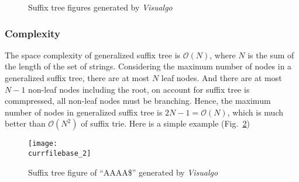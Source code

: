 \documentclass[catalog.tex]{subfiles}
\begin{document}
\begin{figure}[!htb]
	\centering
	\hspace{2cm} %
	\caption{Suffix tree figures generated by {\it Visualgo}\cite{visualgo.net}}
	\label{fig:\currfilebase_group1}
\end{figure}

	\subsubsection*{Complexity}
		The space complexity of generalized suffix tree is $\mathcal{O}(N)$, where $N$ is the sum of the length of the set of strings. Considering the maximum number of nodes in a generalized suffix tree, there are at most $N$ leaf nodes. And there are at most $N-1$ non-leaf nodes including the root, on account for suffix tree is commpressed, all non-leaf nodes must be branching. Hence, the maximum number of nodes in generalized suffix tree is $2N-1 = \mathcal{O}(N)$, which is much better than $\mathcal{O}(N^2)$ of suffix trie. Here is a simple example (Fig.~\ref{fig:\currfilebase_group2})


		\begin{figure}[!htb]
			\centering
			\texttt{[image: \\currfilebase\_2]}
			\caption{Suffix tree figure of ``AAAA\$'' generated by {\it Visualgo}\cite{visualgo.net}}
			\label{fig:\currfilebase_group2}
		\end{figure}
\end{document}
